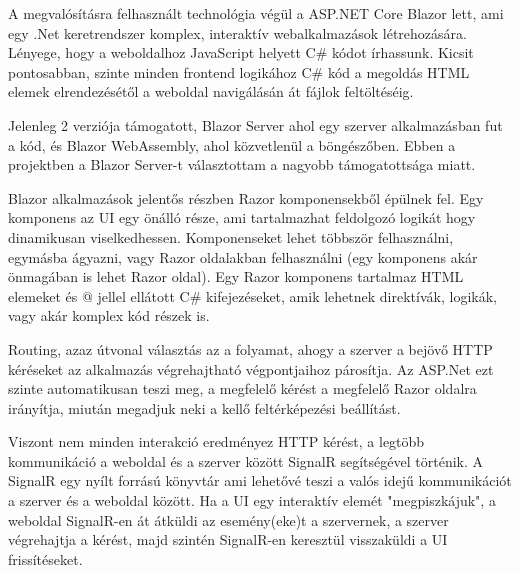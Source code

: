 

A megvalósításra felhasznált technológia végül a ASP.NET Core Blazor lett, ami egy .Net keretrendszer komplex, interaktív webalkalmazások létrehozására. Lényege, hogy a weboldalhoz  JavaScript helyett C# kódot írhassunk. Kicsit pontosabban, szinte minden frontend logikához C# kód a megoldás HTML elemek elrendezésétől a weboldal navigálásán át fájlok feltöltéséig.

Jelenleg 2 verziója támogatott, Blazor Server ahol egy szerver alkalmazásban fut a kód, és Blazor WebAssembly, ahol közvetlenül a böngészőben. Ebben a projektben a Blazor Server-t választottam a nagyobb támogatottsága miatt.

Blazor alkalmazások jelentős részben Razor komponensekből épülnek fel. Egy komponens az UI egy önálló része, ami tartalmazhat feldolgozó logikát hogy dinamikusan viselkedhessen. Komponenseket lehet többször felhasználni, egymásba ágyazni, vagy Razor oldalakban felhasználni (egy komponens akár önmagában is lehet Razor oldal). Egy Razor komponens tartalmaz HTML elemeket és @ jellel ellátott C# kifejezéseket, amik lehetnek direktívák, logikák, vagy akár komplex kód részek is.

Routing, azaz útvonal választás az a folyamat, ahogy a szerver a bejövő HTTP kéréseket az alkalmazás végrehajtható végpontjaihoz párosítja. Az ASP.Net ezt szinte automatikusan teszi meg, a megfelelő kérést a megfelelő Razor oldalra irányítja, miután megadjuk neki a kellő feltérképezési beállítást. 

Viszont nem minden interakció eredményez HTTP kérést, a legtöbb kommunikáció a weboldal és a szerver között SignalR segítségével történik. A SignalR egy nyílt forrású könyvtár ami lehetővé teszi a valós idejű kommunikációt a szerver és a weboldal között. Ha a UI egy interaktív elemét "megpiszkájuk", a weboldal SignalR-en át átküldi az esemény(eke)t a szervernek, a szerver végrehajtja a kérést, majd szintén SignalR-en keresztül visszaküldi a UI frissítéseket.

